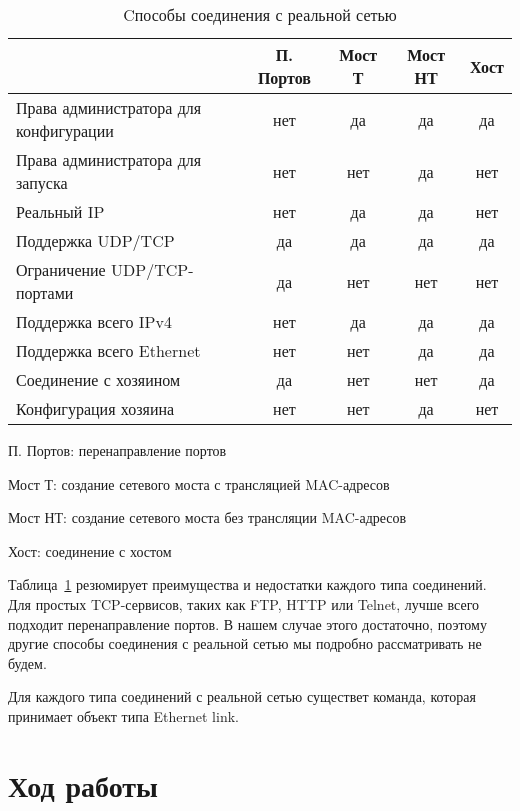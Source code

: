 \begin{table}[htb]
    \caption{Cпособы соединения с реальной сетью}
    \label{tab:cmp-real-network-connection}
    \center
    \begin{tabularx}{\textwidth}{|X|c|c|c|c|}
    \hline
        &   П. Портов   &   Мост Т  &   Мост НТ &   Хост \\
    \hline
    Права администратора для конфигурации   & нет   & да    & да    & да \\
    Права администратора для запуска    & нет   & нет   & да    & нет \\
    Реальный IP & нет   & да    & да    & нет \\
    Поддержка UDP/TCP   & да    & да    & да    & да \\
    Ограничение UDP/TCP-портами & да    & нет   & нет   & нет \\
    Поддержка всего IPv4    & нет   & да    & да    & да \\
    Поддержка всего Ethernet    & нет   & нет   & да    & да \\
    Соединение с хозяином   & да    & нет   & нет   & да \\
    Конфигурация хозяина    & нет   & нет   & да    & нет \\
    \hline
    \end{tabularx}

\begin{description*}
    \item[П. Портов:] перенаправление портов
    \item[Мост Т:] создание сетевого моста с трансляцией MAC-адресов
    \item[Мост НТ:] создание сетевого моста без трансляции MAC-адресов
    \item[Хост:] соединение с хостом
\end{description*}

\end{table}

Таблица~\ref{tab:cmp-real-network-connection} резюмирует преимущества и недостатки каждого типа соединений. Для простых TCP-сервисов, таких как FTP, HTTP или Telnet, лучше всего подходит перенаправление портов. В нашем случае этого достаточно, поэтому другие способы соединения с реальной сетью мы подробно рассматривать не будем.

Для каждого типа соединений с реальной сетью существет команда, которая принимает объект типа Ethernet link.

\section{Ход работы}

